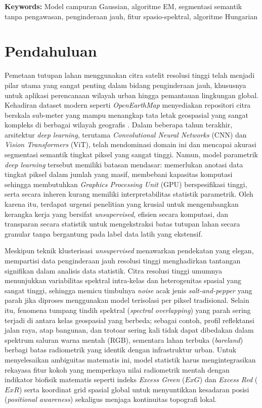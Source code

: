 \documentclass[11pt,twoside]{article}
\newcommand{\SMDSKeywords}[1]{
\vspace{0.5em}
\noindent\textbf{Keywords:} #1
}
\begin{document}
\SMDSKeywords{Model campuran Gaussian, algoritme EM, segmentasi semantik tanpa pengawasan, penginderaan jauh, fitur spasio-spektral, algoritme Hungarian}

\section{Pendahuluan}
\label{Sec:Intro}
Pemetaan tutupan lahan menggunakan citra satelit resolusi tinggi telah menjadi pilar utama
yang sangat penting dalam bidang penginderaan jauh, khususnya untuk aplikasi perencanaan 
wilayah urban hingga pemantauan lingkungan global. Kehadiran dataset modern seperti 
\textit{OpenEarthMap} menyediakan repositori citra berskala sub-meter yang mampu 
menangkap tata letak geospasial yang sangat kompleks di berbagai wilayah 
geografis \cite{tokula2022openearthmap}. Dalam beberapa tahun terakhir, arsitektur 
\textit{deep learning}, terutama \textit{Convolutional Neural Networks} (CNN) 
dan \textit{Vision Transformers} (ViT), telah mendominasi domain ini dan mencapai akurasi 
segmentasi semantik tingkat piksel yang sangat tinggi. Namun, model parametrik 
\textit{deep learning} tersebut memiliki batasan mendasar: memerlukan anotasi data 
tingkat piksel dalam jumlah yang masif, membebani kapasitas komputasi sehingga 
membutuhkan \textit{Graphics Processing Unit} (GPU) berspesifikasi tinggi, serta 
secara inheren kurang memiliki interpretabilitas statistik parametrik. 
Oleh karena itu, terdapat urgensi penelitian yang krusial untuk mengembangkan 
kerangka kerja yang bersifat \textit{unsupervised}, efisien secara komputasi, 
dan transparan secara statistik untuk mengekstraksi batas tutupan lahan secara 
granular tanpa bergantung pada label data latih yang ekstensif.

Meskipun teknik klusterisasi \textit{unsupervised} menawarkan pendekatan yang elegan, 
mempartisi data penginderaan jauh resolusi tinggi menghadirkan tantangan signifikan 
dalam analisis data statistik. Citra resolusi tinggi umumnya menunjukkan variabilitas 
spektral intra-kelas dan heterogenitas spasial yang sangat tinggi, sehingga memicu 
timbulnya \textit{noise} acak jenis \textit{salt-and-pepper} yang parah jika diproses 
menggunakan model terisolasi per piksel tradisional. Selain itu, fenomena tumpang 
tindih spektral (\textit{spectral overlapping}) yang parah sering terjadi di antara 
kelas geospasial yang berbeda; sebagai contoh, profil reflektansi jalan raya, atap 
bangunan, dan trotoar sering kali tidak dapat dibedakan dalam spektrum saluran warna 
mentah (RGB), sementara lahan terbuka (\textit{bareland}) berbagi batas radiometrik 
yang identik dengan infrastruktur urban. Untuk menyelesaikan ambiguitas matematis ini, 
model statistik harus mengintegrasikan rekayasa fitur kokoh yang memperkaya nilai 
radiometrik mentah dengan indikator biofisik matematis seperti indeks 
\textit{Excess Green} ($ExG$) dan \textit{Excess Red} 
($ExR$) \cite{woebbecke1995color} serta koordinat grid spasial global untuk menyuntikkan 
kesadaran posisi (\textit{positional awareness}) sekaligus menjaga kontinuitas topografi 
lokal.
\end{document}
